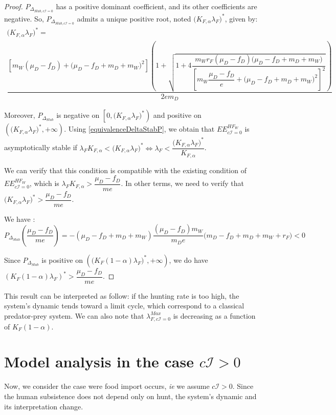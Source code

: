 \documentclass{article}
\newcommand{\lfw}{\lambda_{F}}
\newcommand{\lfw}{\lambda_{F}}
\newcommand{\Kfa}{K_{F,\alpha}}
\newcommand{\cI}{c \mathcal{I}}
\begin{document}
\begin{proof}
$P_{\Delta_{Stab, \cI = 0}}$ has a positive dominant coefficient, and its other coefficients are negative. So,  $P_{\Delta_{Stab, \cI = 0}}$ admits a unique positive root, noted $\Big(\Kfa \lfw \Big)^*$, given by:
\begin{multline}
\Big(\Kfa \lfw \Big)^* = \\
 \dfrac{\left[m_{W}(\mu_{D}-f_{D})+\big(\mu_{D}-f_{D}+m_{D}+m_{W})^{2}\right]\left(1+\sqrt{1+4\dfrac{m_{W}r_{F}\left(\mu_{D}-f_{D}\right)\big(\mu_{D}-f_{D}+m_{D}+m_{W})}{\left[m_{W}\dfrac{\mu_{D}-f_{D}}{e}+\big(\mu_{D}-f_{D}+m_{D}+m_{W})^{2}\right]^{2}}}\right)}{2em_D}
\end{multline}

Moreover, $P_{\Delta_{Stab}}$ is negative on $\left[0, \Big(\Kfa \lfw \Big)^* \right)$ and positive on $\left(\Big(\Kfa \lfw \Big)^*, +\infty \right)$. Using \eqref{equivalenceDeltaStabP}, we obtain that $EE^{HF_W}_{\cI = 0}$ is asymptotically stable if $\lfw \Kfa < \Big(\Kfa \lfw \Big)^* \Leftrightarrow \lfw  < \dfrac{\Big(\Kfa \lfw \Big)^*}{\Kfa}$.

We can verify that this condition is compatible with the existing condition of $EE^{HF_W}_{\cI = 0}$, which is $\lfw \Kfa > \dfrac{\mu_D - f_D}{m e}$. In other terms, we need to verify that $\Big(\Kfa \lfw \Big)^* > \dfrac{\mu_D - f_D}{m e}$.

We have :
$$P_{\Delta_{Stab}}(\dfrac{\mu_D - f_D}{m e}) = -(\mu_D - f_D + m_D +m_W) \dfrac{(\mu_D - f_D) m_W}{m_D e} \Big(m_D - f_D + m_D + m_W + r_F) < 0$$

Since $P_{\Delta_{Stab}}$ is positive on $\left(\Big(K_F(1-\alpha)\lambda_F \Big)^*, +\infty \right)$, we do have $(K_F(1-\alpha)\lambda_F)^* > \dfrac{\mu_D - f_D}{m e}$.
\end{proof}

This result can be interpreted as follow: if the hunting rate is too high, the system's dynamic tends toward a limit cycle, which correspond to a classical predator-prey system. We can also note that $\lambda_{F, \cI =0}^{Max} $ is decreasing as a function of $K_F(1-\alpha)$. 



\section{Model analysis in the case $c\mathcal{I} > 0$}
Now, we consider the case were food import occurs, \textit{ie} we assume $c\mathcal{I} > 0$. Since the human subsistence does not depend only on hunt, the system's dynamic and its interpretation change.
\end{document}
